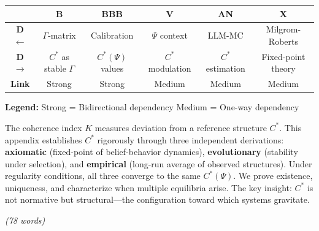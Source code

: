 \begin{tcolorbox}[colback=white, colframe=black,
    title=\textbf{Cross-Reference Map}]

\begin{center}
\small
\begin{tabular}{@{}c|ccccc@{}}
\toprule
& \textbf{B} & \textbf{BBB} & \textbf{V} & \textbf{AN} & \textbf{X} \\
\midrule
\textbf{D $\leftarrow$} & $\Gamma$-matrix & Calibration & $\Psi$ context & LLM-MC & Milgrom-Roberts \\
\textbf{D $\rightarrow$} & $C^*$ as stable $\Gamma$ & $C^*(\Psi)$ values & $C^*$ modulation & $C^*$ estimation & Fixed-point theory \\
\midrule
\textbf{Link} & \cellcolor{red!20}Strong & \cellcolor{red!20}Strong & \cellcolor{yellow!20}Medium & \cellcolor{yellow!20}Medium & \cellcolor{yellow!20}Medium \\
\bottomrule
\end{tabular}
\end{center}

\textbf{Legend:}
\colorbox{red!20}{Strong} = Bidirectional dependency \quad
\colorbox{yellow!20}{Medium} = One-way dependency

\end{tcolorbox}


\begin{tcolorbox}[colback=white, colframe=black,
    title=\textbf{Abstract}]

The coherence index $K$ measures deviation from a reference structure $C^*$.
This appendix establishes $C^*$ rigorously through three independent derivations:
\textbf{axiomatic} (fixed-point of belief-behavior dynamics),
\textbf{evolutionary} (stability under selection), and
\textbf{empirical} (long-run average of observed structures).
Under regularity conditions, all three converge to the same $C^*(\Psi)$.
We prove existence, uniqueness, and characterize when multiple equilibria arise.
The key insight: $C^*$ is not normative but structural---the configuration
toward which systems gravitate.

\textit{(78 words)}

\end{tcolorbox}



